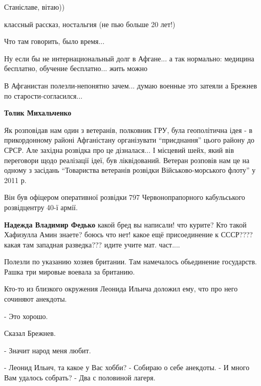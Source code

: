 \begin{itemize}
\begin{itemize}

Станіславе, вітаю))
\end{itemize} %

классный рассказ, ностальгия (не пью больше 20 лет!)

Что там говорить, было время...

Ну если бы не интернациональный долг в Афгане... а так нормально: медицина
бесплатно, обучение бесплатно... жить можно

В Афганистан полезли-непонятно зачем... думаю военные это затеяли а Брежнев по старости-согласился...

\begin{itemize} %
\textbf{Толик Михальченко} 

Як розповідав нам один з ветеранів, полковник ГРУ, була геополітична ідея - в
прикордонному районі Афганістану організувати \enquote{приєднання} цього району до
СРСР. Але західна розвідка про це дізналася... І місцевий шейх, який вів
переговори щодо реалізації ідеї, був ліквідований. Ветеран розповів нам це на
одному з засідань \enquote{Товариства ветеранів розвідки Військово-морського флоту} у
2011 р.

Він був офіцером оперативної розвідки 797 Червонопрапорного кабульського
розвідцентру 40-ї армії.


\textbf{Надежда Владимир Федько} какой бред вы написали! что курите? Кто такой Хафизулла Амин знаете? боюсь что нет! какое ещё присоединение к СССР???? какая там западная разведка??? идите учите мат. част....

Полезли по указанию хозяев британии. Там намечалось обьединение государств. Рашка три мировые воевала за британию.
\end{itemize} %


Кто-то из близкого окружения Леонида Ильича доложил ему, что про него сочиняют
анекдоты.

- Это хорошо.

Сказал Брежнев.

- Значит народ меня любит.

\begin{itemize} %

\obeycr
- Леонид Ильич, та какое у Вас хобби?
- Собираю о себе анекдоты.
- И много Вам удалось собрать?
- Два с половиной лагеря.
\restorecr



\end{itemize}
\end{itemize}
